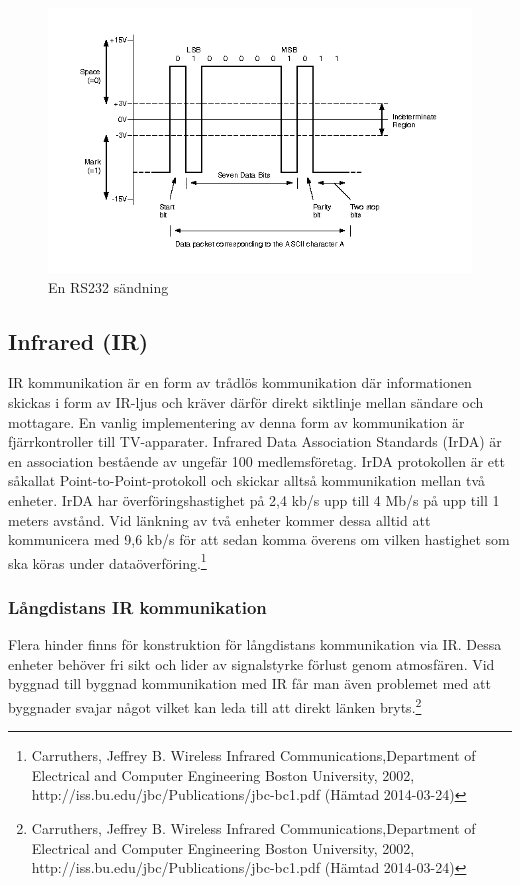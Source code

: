 \documentclass[a4paper,12pt,fleqn]{article}
\begin{document}
\begin{figure}[htp]
  \begin{center}
  \includegraphics[keepaspectratio=true,width=0.5\linewidth]{RS232}  %
  \caption{En RS232 sändning\label{fig:rs232}} %
  \end{center}
\end{figure}


\subsection{Infrared (IR)}
IR kommunikation är en form av trådlös kommunikation där informationen skickas i form av IR-ljus och kräver därför direkt siktlinje mellan sändare och mottagare. En vanlig implementering av denna form av kommunikation är fjärrkontroller till TV-apparater.
Infrared Data Association Standards (IrDA) är en association bestående av ungefär 100 medlemsföretag. IrDA protokollen är ett såkallat Point-to-Point-protokoll och skickar alltså kommunikation mellan två enheter. IrDA har överföringshastighet på 2,4 kb/s upp till 4 Mb/s på upp till 1 meters avstånd. Vid länkning av två enheter kommer dessa alltid att kommunicera med 9,6 kb/s för att sedan komma överens om vilken hastighet som ska köras under dataöverföring.\footnote{\label{Carruthers}Carruthers, Jeffrey B. Wireless Infrared Communications,Department of Electrical and Computer Engineering
Boston University, 2002, http://iss.bu.edu/jbc/Publications/jbc-bc1.pdf (Hämtad 2014-03-24)}  

\subsubsection{Långdistans IR kommunikation}
Flera hinder finns för konstruktion för långdistans kommunikation via IR. Dessa enheter behöver fri sikt och lider av signalstyrke förlust genom atmosfären. Vid byggnad till byggnad kommunikation med IR får man även problemet med att byggnader svajar något vilket kan leda till att direkt länken bryts.\footnote{\label{Carruthers2}Carruthers, Jeffrey B. Wireless Infrared Communications,Department of Electrical and Computer Engineering
Boston University, 2002, http://iss.bu.edu/jbc/Publications/jbc-bc1.pdf (Hämtad 2014-03-24)}
\end{document}
